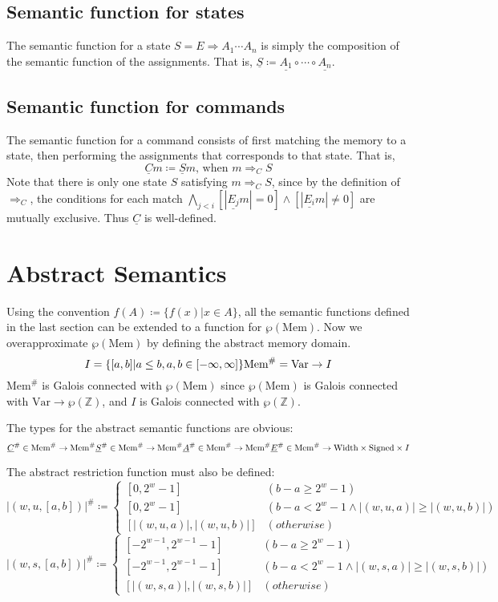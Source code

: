 \documentclass[fleqn]{article}
\theoremstyle{definition}
\begin{document}
\subsection{Semantic function for states}
The semantic function for a state $S=E\Rightarrow A_{1}\cdots A_{n}$ is simply the composition of the semantic function of the assignments. That is, $\underline{S}\coloneq\underline{A_{1}}\circ\cdots\circ\underline{A_{n}}$.

\subsection{Semantic function for commands}
The semantic function for a command consists of first matching the memory to a state, then performing the assignments that corresponds to that state. That is,
\[
  \underline{C}m\coloneq\underline{S}m \text{, when }m\Rightarrow_{C}S
\]
Note that there is only one state $S$ satisfying $m\Rightarrow_{C}S$, since by the definition of $\Rightarrow_{C}$, the conditions for each match $\bigwedge_{j<i}[|\underline{E_{j}}m|=0]\wedge[|\underline{E_{i}}m|\neq 0]$ are mutually exclusive. Thus $\underline{C}$ is well-defined.

\section{Abstract Semantics}
Using the convention $f(A)\coloneq\{f(x)|x\in A\}$, all the semantic functions defined in the last section can be extended to a function for $\wp(\text{Mem})$. Now we overapproximate $\wp(\text{Mem})$ by defining the abstract memory domain.
\[
  I=\{[a,b]|a\le b, a, b\in[-\infty, \infty]\}\\
  \text{Mem}^{\#}=\text{Var}\rightarrow I
\]
$\text{Mem}^{\#}$ is Galois connected with $\wp(\text{Mem})$ since $\wp(\text{Mem})$ is Galois connected with $\text{Var}\rightarrow \wp(\mathbb{Z})$, and $I$ is Galois connected with $\wp(\mathbb{Z})$.

The types for the abstract semantic functions are obvious:
\[
  \underline{C}^{\#}\in\text{Mem}^{\#}\rightarrow\text{Mem}^{\#}\\
  \underline{S}^{\#}\in\text{Mem}^{\#}\rightarrow\text{Mem}^{\#}\\
  \underline{A}^{\#}\in\text{Mem}^{\#}\rightarrow\text{Mem}^{\#}\\
  \underline{E}^{\#}\in\text{Mem}^{\#}\rightarrow\text{Width}\times\text{Signed}\times I
\]

The abstract restriction function must also be defined:
\[
  |(w,u,[a,b])|^{\#}\coloneq
  \begin{cases}
    [0, 2^{w}-1]&(b-a\ge 2^{w}-1)\\
    [0, 2^{w}-1]&(b-a < 2^{w}-1\wedge |(w,u,a)|\ge|(w,u,b)|)\\
    [|(w,u,a)|,|(w,u,b)|]&(otherwise)
  \end{cases}
\]
\[
  |(w,s,[a,b])|^{\#}\coloneq
  \begin{cases}
    [-2^{w-1}, 2^{w-1}-1]&(b-a\ge 2^{w}-1)\\
    [-2^{w-1}, 2^{w-1}-1]&(b-a < 2^{w}-1\wedge |(w,s,a)|\ge|(w,s,b)|)\\
    [|(w,s,a)|,|(w,s,b)|]&(otherwise)
  \end{cases}
\]
\end{document}

